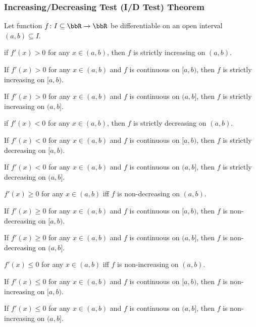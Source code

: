 \subsubsection{Increasing/Decreasing Test (I/D Test) Theorem}
Let function $f\colon I\subseteq\bbR\to\bbR$ be differentiable on an open interval $(a,b)\subseteq I$.
\bit
\item if $f'(x)>0$ for any $x\in (a,b)$, then $f$ is strictly increasing on $(a,b)$.
\item If $f'(x)>0$ for any $x\in (a,b)$ and $f$ is continuous on $[a,b)$, then $f$ is strictly increasing on $[a,b)$.
\item If $f'(x)>0$ for any $x\in (a,b)$ and $f$ is continuous on $(a,b]$, then $f$ is strictly increasing on $(a,b]$.
\item if $f'(x)<0$ for any $x\in (a,b)$, then $f$ is strictly decreasing on $(a,b)$.
\item If $f'(x)<0$ for any $x\in (a,b)$ and $f$ is continuous on $[a,b)$, then $f$ is strictly decreasing on $[a,b)$.
\item If $f'(x)<0$ for any $x\in (a,b)$ and $f$ is continuous on $(a,b]$, then $f$ is strictly decreasing on $(a,b]$.
\item $f'(x)\geq 0$ for any $x\in (a,b)$ iff $f$ is non-decreasing on $(a,b)$.
\item If $f'(x)\geq 0$ for any $x\in (a,b)$ and $f$ is continuous on $[a,b)$, then $f$ is non-decreasing on $[a,b)$.
\item If $f'(x)\geq 0$ for any $x\in (a,b)$ and $f$ is continuous on $(a,b]$, then $f$ is non-decreasing on $(a,b]$.
\item $f'(x)\leq 0$ for any $x\in (a,b)$ iff $f$ is non-increasing on $(a,b)$.
\item If $f'(x)\leq 0$ for any $x\in (a,b)$ and $f$ is continuous on $[a,b)$, then $f$ is non-increasing on $[a,b)$.
\item If $f'(x)\leq 0$ for any $x\in (a,b)$ and $f$ is continuous on $(a,b]$, then $f$ is non-increasing on $(a,b]$.
\eit
